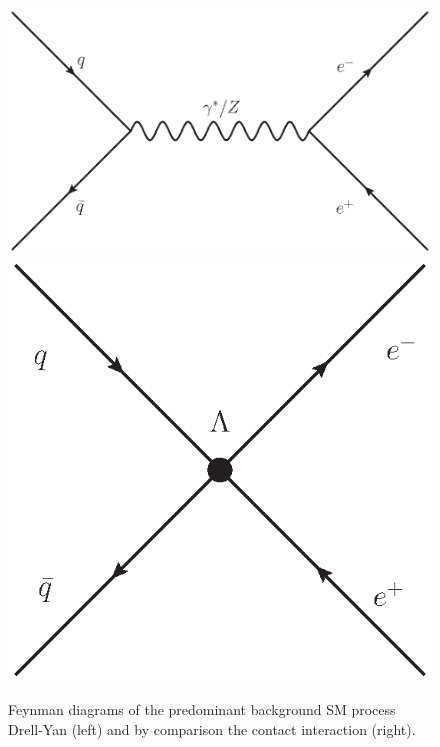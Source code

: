         \begin{figure}[h]
            \begin{center}
            \includegraphics[width=0.45\linewidth]{images/DY_qq_ee.eps}
            \includegraphics[width=0.3\linewidth]{images/CI_qq_ee.eps}
            \end{center}
            \caption{Feynman diagrams of the predominant background SM process Drell-Yan (left) and by comparison the contact interaction (right).}
            \label{fig:fd}
        \end{figure}

